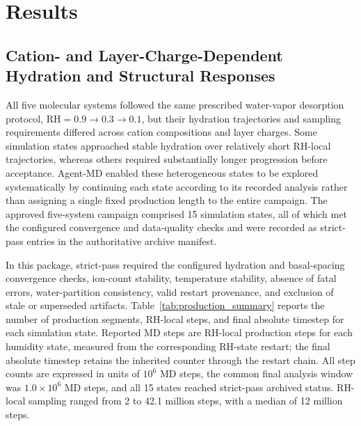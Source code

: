 \section{Results}

\subsection{Cation- and Layer-Charge-Dependent Hydration and Structural Responses}

All five molecular systems followed the same prescribed water-vapor desorption protocol, $\mathrm{RH} = 0.9 \rightarrow 0.3 \rightarrow 0.1$, but their hydration trajectories and sampling requirements differed across cation compositions and layer charges. Some simulation states approached stable hydration over relatively short RH-local trajectories, whereas others required substantially longer progression before acceptance. Agent-MD enabled these heterogeneous states to be explored systematically by continuing each state according to its recorded analysis rather than assigning a single fixed production length to the entire campaign. The approved five-system campaign comprised 15 simulation states, all of which met the configured convergence and data-quality checks and were recorded as strict-pass entries in the authoritative archive manifest.

In this package, strict-pass required the configured hydration and basal-spacing convergence checks, ion-count stability, temperature stability, absence of fatal errors, water-partition consistency, valid restart provenance, and exclusion of stale or superseded artifacts. Table~\ref{tab:production_summary} reports the number of production segments, RH-local steps, and final absolute timestep for each simulation state. Reported MD steps are RH-local production steps for each humidity state, measured from the corresponding RH-state restart; the final absolute timestep retains the inherited counter through the restart chain. All step counts are expressed in units of $10^{6}$ MD steps, the common final analysis window was $1.0\times10^{6}$ MD steps, and all 15 states reached strict-pass archived status. RH-local sampling ranged from 2 to 42.1 million steps, with a median of 12 million steps.


